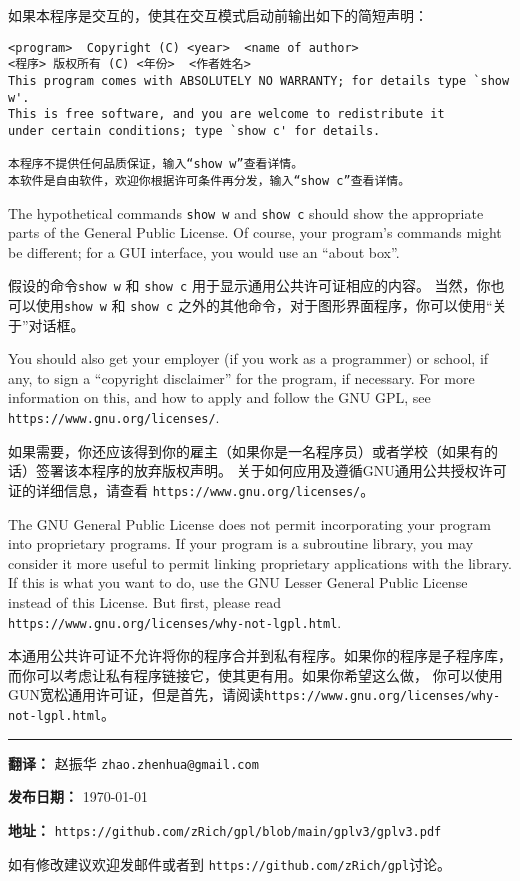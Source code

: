 \documentclass[11pt]{article}
\begin{document}
\begin{enumerate}
        如果本程序是交互的，使其在交互模式启动前输出如下的简短声明：

        {\footnotesize
        \begin{verbatim}
<program>  Copyright (C) <year>  <name of author>
<程序> 版权所有 (C) <年份>  <作者姓名>
This program comes with ABSOLUTELY NO WARRANTY; for details type `show w'.
This is free software, and you are welcome to redistribute it
under certain conditions; type `show c' for details.

本程序不提供任何品质保证，输入“show w”查看详情。
本软件是自由软件，欢迎你根据许可条件再分发，输入“show c”查看详情。
\end{verbatim}
        }

        The hypothetical commands {\tt show w} and {\tt show c} should show
        the appropriate
        parts of the General Public License.  Of course, your program's commands
        might be different; for a GUI interface, you would use an ``about box''.

        假设的命令{\tt show w} 和 {\tt show c} 用于显示通用公共许可证相应的内容。
        当然，你也可以使用{\tt show w} 和 {\tt show c} 之外的其他命令，对于图形界面程序，你可以使用“关于”对话框。

        You should also get your employer (if you work as a programmer) or
        school, if any, to sign a ``copyright disclaimer'' for the program, if
        necessary.  For more information on this, and how to apply and follow
        the GNU GPL, see \texttt{https://www.gnu.org/licenses/}.

        如果需要，你还应该得到你的雇主（如果你是一名程序员）或者学校（如果有的话）签署该本程序的放弃版权声明。
        关于如何应用及遵循GNU通用公共授权许可证的详细信息，请查看 \texttt{https://www.gnu.org/licenses/}。

        The GNU General Public License does not permit incorporating your
        program into proprietary programs.  If your program is a subroutine
        library, you may consider it more useful to permit linking proprietary
        applications with the library.  If this is what you want to do, use
        the GNU Lesser General Public License instead of this License.  But
        first, please read \texttt{https://www.gnu.org/licenses/why-not-lgpl.html}.

        本通用公共许可证不允许将你的程序合并到私有程序。如果你的程序是子程序库，而你可以考虑让私有程序链接它，使其更有用。如果你希望这么做，
        你可以使用GUN宽松通用许可证，但是首先，请阅读\texttt{https://www.gnu.org/licenses/why-not-lgpl.html}。

\end{enumerate}

\vfill

\noindent\rule{\textwidth}{0.4pt}

\textbf{翻译：} 赵振华 \texttt{zhao.zhenhua@gmail.com}

\textbf{发布日期：} \today

\textbf{地址：} \texttt{https://github.com/zRich/gpl/blob/main/gplv3/gplv3.pdf}

如有修改建议欢迎发邮件或者到 \texttt{https://github.com/zRich/gpl}讨论。
\end{document}
